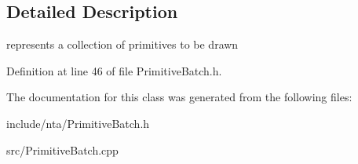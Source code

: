 \subsection{Detailed Description}
represents a collection of primitives to be drawn 

Definition at line 46 of file Primitive\+Batch.\+h.



The documentation for this class was generated from the following files\+:\begin{DoxyCompactItemize}
\item 
include/nta/Primitive\+Batch.\+h\item 
src/Primitive\+Batch.\+cpp\end{DoxyCompactItemize}
